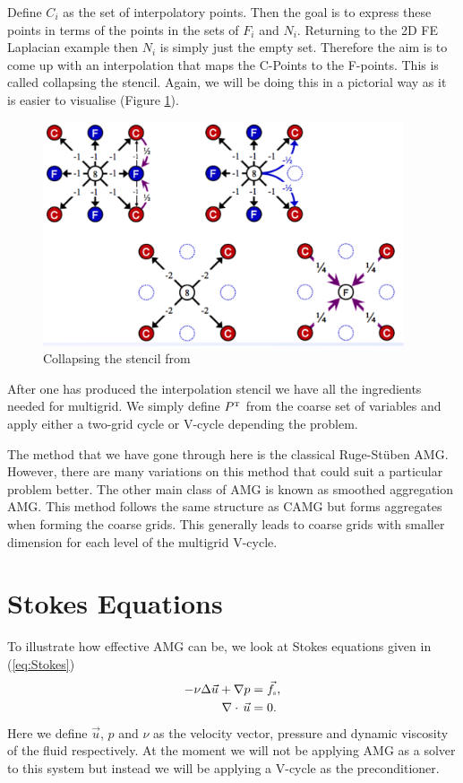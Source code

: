 \documentclass[11pt]{article}
\numberwithin{equation}{section}    %
\renewcommand{\div}{\nabla\cdot\,}
\newcommand{\U}{\vec u}
\newcommand{\Fs}{\vec{f}_{\mbox{\tiny s}}}
\begin{document}
\noindent Define $C_i$ as the set of interpolatory points. Then the goal is to express these points in terms of the points in the sets of $F_i$ and $N_i$.  Returning to the 2D FE Laplacian example then $N_i$ is simply just the empty set. Therefore the aim is to come up with an interpolation that maps the C-Points to the F-points. This is called collapsing the stencil. Again, we will be doing this in a pictorial way as it is easier to visualise (Figure \ref{fig:stencil}).
\begin{figure}[h!]
\begin{center}
\includegraphics[width=4.2in]{../figures/Interp.png}
\caption{Collapsing the stencil from \cite{falgout2006introduction}}
\label{fig:stencil}
\end{center}
\end{figure}


After one has produced the interpolation stencil we have all the ingredients needed for multigrid. We simply define $P^{\mbox{\tiny T}}$ from the coarse set of variables and apply either a two-grid cycle or V-cycle depending the problem.

The method that we have gone through here is the classical Ruge-St{\"u}ben AMG. However, there are many variations on this method that could suit a particular problem better. The other main class of AMG is known as smoothed aggregation AMG. This method follows the same structure as CAMG but forms aggregates when forming the coarse grids. This generally leads to coarse grids with smaller dimension for each level of the multigrid V-cycle.


\section{Stokes Equations} \label{sec:stokes}


 To illustrate how effective AMG can be, we look at Stokes equations given in (\ref{eq:Stokes})
\begin{equation} \label{eq:Stokes}
    \begin{aligned}
        -\nu \Delta \U+ \nabla p &= \Fs,\\
        \div \U     &= 0.
    \end{aligned}
\end{equation}
Here we define $\U$, $p$ and $\nu$ as the velocity vector, pressure and dynamic viscosity of the fluid respectively. At the moment we will not be applying AMG as a solver to this system but instead we will be applying a V-cycle as the preconditioner.
\end{document}

